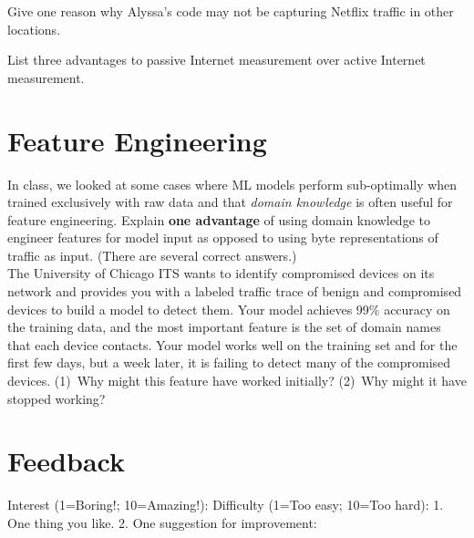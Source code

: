 Give one reason why Alyssa's code may not be capturing Netflix traffic in
other locations.
\\
\eprob

List three advantages to passive Internet measurement over active Internet measurement.
\\
\eprob


\section*{Feature Engineering}

In class, we looked at some cases where ML models perform sub-optimally when
trained exclusively with raw data and  
that {\em domain knowledge} is often useful for feature engineering.
\fi
{}
Explain {\bf one advantage} of using domain knowledge to engineer features for
model input as opposed to using byte representations of traffic as input.
(There are several correct answers.)
\\
\eprob
{}
The University of Chicago ITS wants to identify compromised devices on its
network and provides you with a labeled traffic trace of benign and
compromised devices to build a model to detect them. Your model achieves 99\%
accuracy on the training data, and the most important feature is the set of
domain names that each device contacts. Your model works well on the training
set and for the first few days, but a week later, it is failing to detect many
of the compromised devices. (1)~Why might this feature have worked initially?
(2)~Why might it have stopped working?
\\
\eprob

\section*{Feedback}
\vspace*{-0.1in}
Interest (1=Boring!; 10=Amazing!):
Difficulty (1=Too easy; 10=Too hard):
\eprob
{}
1. One thing you like. 2. One suggestion for improvement:

\eprob

